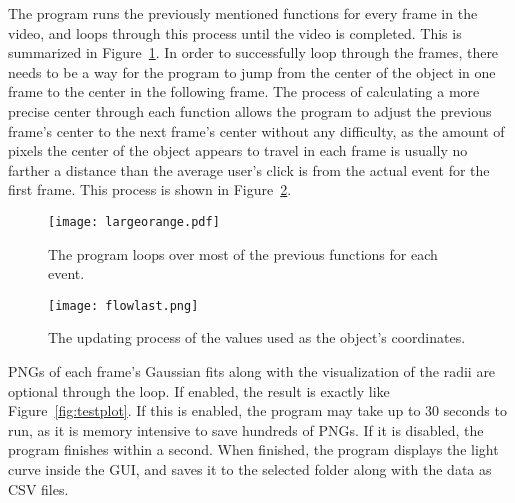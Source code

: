 The program runs the previously mentioned functions for every frame in the video, and loops through this process until the video is completed. This is summarized in Figure~\ref{fig:moreflow}. In order to successfully loop through the frames, there needs to be a way for the program to jump from the center of the object in one frame to the center in the following frame. The process of calculating a more precise center through each function allows the program to adjust the previous frame's center to the next frame's center without any difficulty, as the amount of pixels the center of the object appears to travel in each frame is usually no farther a distance than the average user's click is from the actual event for the first frame. This process is shown in Figure~\ref{fig:updatingxy}.

\begin{figure}[ht!]
	\centering
	\texttt{[image: largeorange.pdf]}
	\caption{The program loops over most of the previous functions for each event.}
	\label{fig:moreflow}
\end{figure}

\begin{figure}[htpb]
	\centering
	\texttt{[image: flowlast.png]}
	\caption{The updating process of the values used as the object's coordinates.}
	\label{fig:updatingxy}
\end{figure}

PNGs of each frame's Gaussian fits along with the visualization of the radii are optional through the loop. If enabled, the result is exactly like Figure~\ref{fig:testplot}. If this is enabled, the program may take up to 30 seconds to run, as it is memory intensive to save hundreds of PNGs. If it is disabled, the program finishes within a second. When finished, the program displays the light curve inside the GUI, and saves it to the selected folder along with the data as CSV files.
